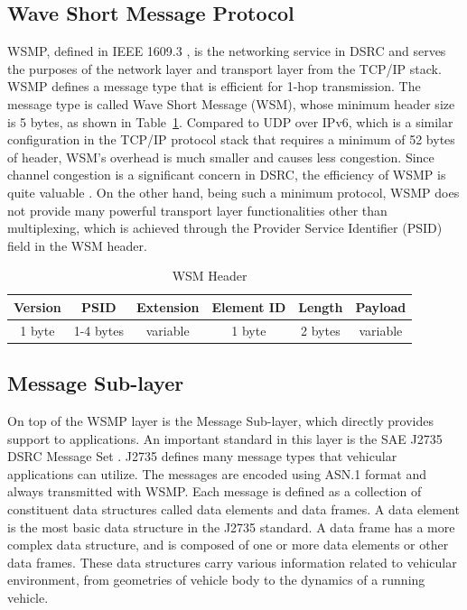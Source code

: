 \documentclass[12pt]{report}
\begin{document}
\subsection{Wave Short Message Protocol}
WSMP, defined in IEEE 1609.3 \cite{ieee16093}, is the networking service in DSRC and serves the purposes of the network layer and transport layer from the TCP/IP stack. WSMP defines a message type that is efficient for 1-hop transmission. The message type is called Wave Short Message (WSM), whose minimum header size is 5 bytes, as shown in Table~\ref{tab:wsm}. Compared to UDP over IPv6, which is a similar configuration in the TCP/IP protocol stack that requires a minimum of 52 bytes of header, WSM's overhead is much smaller and causes less congestion. Since channel congestion is a significant concern in DSRC, the efficiency of WSMP is quite valuable \cite{kenney2011}. On the other hand, being such a minimum protocol, WSMP does not provide many powerful transport layer functionalities other than multiplexing, which is achieved through the Provider Service Identifier (PSID) field in the WSM header.

\begin{table}[h]
  \begin{center}
    \begin{tabular}{|c|c|c|c|c|c|}
      \hline
      Version & PSID      & Extension   & Element ID & Length  & Payload \\ \hline
      1 byte  & 1-4 bytes & variable    & 1 byte     & 2 bytes & variable \\ \hline
    \end{tabular}
    \caption{\label{tab:wsm}WSM Header}
  \end{center}
\end{table}

\subsection{Message Sub-layer}
On top of the WSMP layer is the Message Sub-layer, which directly provides support to applications. An important standard in this layer is the SAE J2735 DSRC Message Set \cite{sae2016j2735}. J2735 defines many message types that vehicular applications can utilize. The messages are encoded using ASN.1 format and always transmitted with WSMP. Each message is defined as a collection of constituent data structures called data elements and data frames. A data element is the most basic data structure in the J2735 standard. A data frame has a more complex data structure, and is composed of one or more data elements or other data frames. \cite{kenney2011} These data structures carry various information related to vehicular environment, from geometries of vehicle body to the dynamics of a running vehicle.
\end{document}
